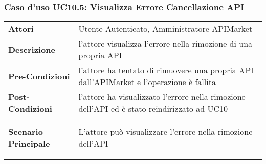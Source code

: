 \subsubsection{Caso d'uso UC10.5: Visualizza Errore Cancellazione API}
\label{UC10.5}

\renewcommand*{\arraystretch}{1.6}
\begin{longtable}{ l | p{11cm}}
	\hline
	\rowcolor{Gray}
	\multicolumn{2}{c}{UC10.5: Visualizza Errore Cancellazione API} \\
	\hline
	\textbf{Attori} &Utente Autenticato, Amministratore APIMarket \\
	\textbf{Descrizione} & l'attore visualizza l'errore nella rimozione di una propria API\\
	\textbf{Pre-Condizioni} & l'attore ha tentato di rimuovere una propria API dall'APIMarket e l'operazione è fallita\\
	\textbf{Post-Condizioni}& l'attore ha visualizzato l'errore nella rimozione dell'API ed è stato reindirizzato ad UC10\\
	\textbf{Scenario Principale} & \begin{enumerate*}[label=(\arabic*.),itemjoin={\newline}]
		\item L'attore può visualizzare l'errore nella rimozione dell'API
	\end{enumerate*}\\
\end{longtable}


